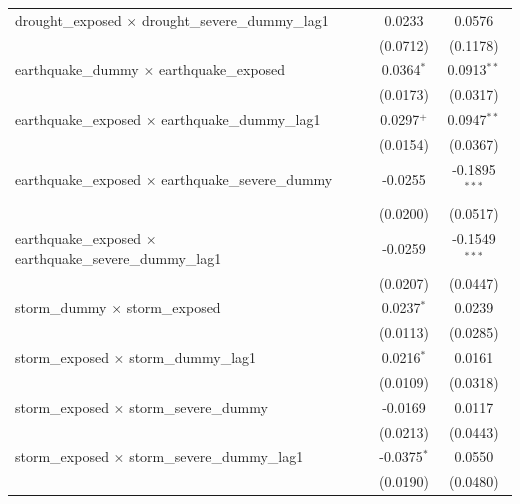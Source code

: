 \begin{tabular}{lcc}
   drought\_exposed $\times$ drought\_severe\_dummy\_lag1            & 0.0233                & 0.0576\\   
                                                                     & (0.0712)              & (0.1178)\\   
   earthquake\_dummy $\times$ earthquake\_exposed                    & 0.0364$^{*}$          & 0.0913$^{**}$\\   
                                                                     & (0.0173)              & (0.0317)\\   
   earthquake\_exposed $\times$ earthquake\_dummy\_lag1              & 0.0297$^{+}$          & 0.0947$^{**}$\\   
                                                                     & (0.0154)              & (0.0367)\\   
   earthquake\_exposed $\times$ earthquake\_severe\_dummy            & -0.0255               & -0.1895$^{***}$\\   
                                                                     & (0.0200)              & (0.0517)\\   
   earthquake\_exposed $\times$ earthquake\_severe\_dummy\_lag1      & -0.0259               & -0.1549$^{***}$\\   
                                                                     & (0.0207)              & (0.0447)\\   
   storm\_dummy $\times$ storm\_exposed                              & 0.0237$^{*}$          & 0.0239\\   
                                                                     & (0.0113)              & (0.0285)\\   
   storm\_exposed $\times$ storm\_dummy\_lag1                        & 0.0216$^{*}$          & 0.0161\\   
                                                                     & (0.0109)              & (0.0318)\\   
   storm\_exposed $\times$ storm\_severe\_dummy                      & -0.0169               & 0.0117\\   
                                                                     & (0.0213)              & (0.0443)\\   
   storm\_exposed $\times$ storm\_severe\_dummy\_lag1                & -0.0375$^{*}$         & 0.0550\\   
                                                                     & (0.0190)              & (0.0480)\\   

\end{tabular}
